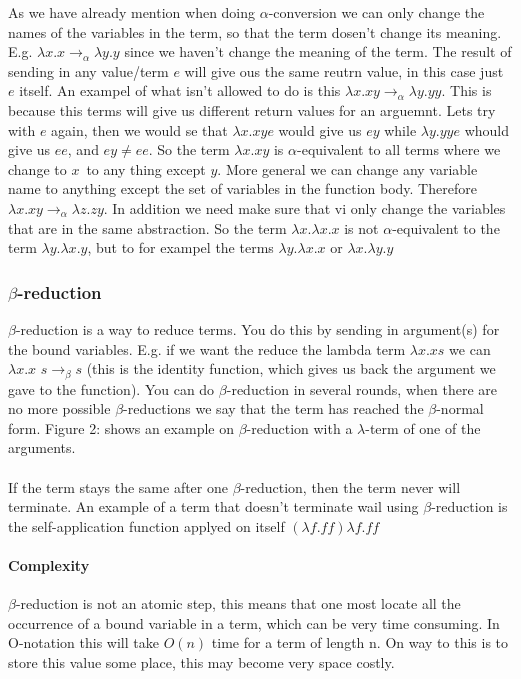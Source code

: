 As we have already mention when doing $\alpha$-conversion we can only change the names of the variables in the term, so that 
the term dosen't change its meaning. E.g. $\lambda x.x \rightarrow_\alpha \lambda y.y$ since we haven't change the meaning of the term. The result of sending in any value/term 
$e$ will give ous the same reutrn value, in this case just $e$ itself. An exampel of what isn't allowed to do is this $\lambda x.xy \rightarrow_\alpha \lambda y.yy$. This is 
because this terms will give us different return values for an arguemnt. Lets try with $e$ again, then we would se that  $\lambda x.xy e$ would give us $ey$ while 
$\lambda y.yy e$ whould give us $ee$, and $ey \neq ee$. So the term $\lambda x.xy$ is $\alpha$-equivalent to all terms where we change to $x$ to any thing except $y$. 
More general we can change any variable name to anything except the set of variables in the function body. Therefore $\lambda x.xy \rightarrow_\alpha \lambda z.zy$.
In addition we need make sure that vi only change the variables that are in the same abstraction. So the term $\lambda x.\lambda x.x $ is not $\alpha$-equivalent to the 
term $\lambda y.\lambda x.y$, but to for exampel the terms $\lambda y.\lambda x.x$ or $\lambda x.\lambda y.y$

\subsubsection{$\beta$-reduction}
$\beta$-reduction is a way to reduce terms. You do this by sending in argument(s) for the bound variables. E.g. if we want the reduce the lambda term $\lambda x. x s$ we can $\lambda x. x$  $s \rightarrow _\beta s$ (this is the identity function, which gives us back the argument we gave to the function). You can do $\beta$-reduction in several rounds, when there are no more possible $\beta$-reductions we say that the term has reached the $\beta$-normal form. Figure 2:  shows an example on $\beta$-reduction with a $\lambda$-term of one of the arguments. \\ \\
If the term stays the same after one $\beta$-reduction, then the term never will terminate. An example of a term that doesn't terminate wail using $\beta$-reduction is the self-application function applyed on itself $(\lambda f.ff) \lambda f.ff$

\paragraph{Complexity}
$\beta$-reduction is not an atomic step, this means that one most locate all the occurrence of a bound variable in a term, which can be very time consuming. In O-notation this will take $O(n)$ time for a term of length n. On way to this is to store this value some place, this may become very space costly. 

